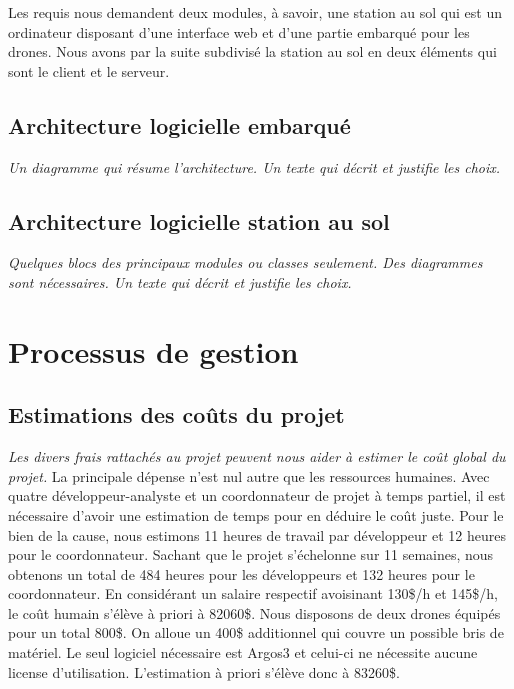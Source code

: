 \documentclass{mistcoursedoc}
\begin{document}
\par Les requis nous demandent deux modules, à savoir, une station au sol qui est un ordinateur disposant d'une interface web et d'une partie embarqué pour les drones. Nous avons par la suite subdivisé la station au sol en deux éléments qui sont le client et le serveur.

\subsection{Architecture logicielle embarqué}

\textit{Un diagramme qui résume l’architecture.  Un texte qui décrit et justifie les choix.}


\subsection{Architecture logicielle station au sol}

\textit{Quelques blocs des principaux modules ou classes seulement.  Des diagrammes sont nécessaires.  Un texte qui décrit et justifie les choix.}
  

\section{Processus de gestion}

\subsection{Estimations des coûts du projet}

\textit{Les divers frais rattachés au projet peuvent nous aider à estimer le coût global du projet.}
La principale dépense n’est nul autre que les ressources humaines. 
Avec quatre développeur-analyste et un coordonnateur de projet à temps partiel, 
il est nécessaire d’avoir une estimation de temps pour en déduire le coût juste. 
Pour le bien de la cause, nous estimons 11 heures de travail par développeur et 12 heures pour le coordonnateur. 
Sachant que le projet s’échelonne sur 11 semaines, nous obtenons un total de 484 heures pour les développeurs 
et 132 heures pour le coordonnateur. 
En considérant un salaire respectif avoisinant 130\$/h et 145\$/h, le coût humain s’élève à priori à 82060\$. 
Nous disposons de deux drones équipés pour un total 800\$. 
On alloue un 400\$ additionnel qui couvre un possible bris de matériel. 
Le seul logiciel nécessaire est Argos3 et celui-ci ne nécessite aucune license d’utilisation.
L’estimation à priori s’élève donc à 83260\$.
\end{document}
